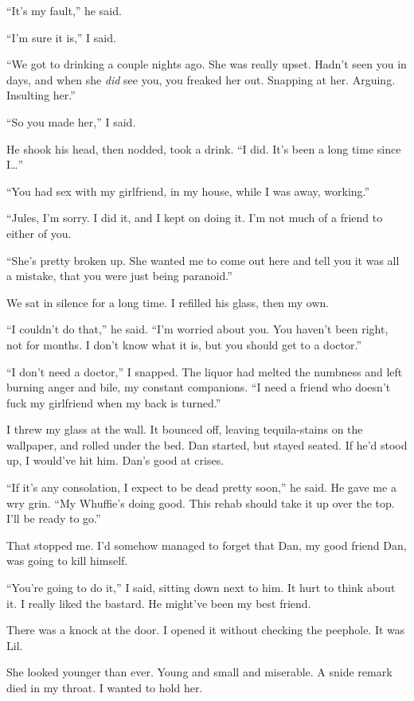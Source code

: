 “It's my fault,” he said.

“I'm sure it is,” I said.

“We got to drinking a couple nights ago. She was really upset.
Hadn't seen you in days, and when she \emph{did} see you, you
freaked her out. Snapping at her. Arguing. Insulting her.”

“So you made her,” I said.

He shook his head, then nodded, took a drink. “I did. It's been a
long time since I…”

“You had sex with my girlfriend, in my house, while I was away,
working.”

“Jules, I'm sorry. I did it, and I kept on doing it. I'm not much
of a friend to either of you.

“She's pretty broken up. She wanted me to come out here and tell
you it was all a mistake, that you were just being paranoid.”

We sat in silence for a long time. I refilled his glass, then my
own.

“I couldn't do that,” he said. “I'm worried about you. You haven't
been right, not for months. I don't know what it is, but you should
get to a doctor.”

“I don't need a doctor,” I snapped. The liquor had melted the
numbness and left burning anger and bile, my constant companions.
“I need a friend who doesn't fuck my girlfriend when my back is
turned.”

I threw my glass at the wall. It bounced off, leaving
tequila-stains on the wallpaper, and rolled under the bed. Dan
started, but stayed seated. If he'd stood up, I would've hit him.
Dan's good at crises.

“If it's any consolation, I expect to be dead pretty soon,” he
said. He gave me a wry grin. “My Whuffie's doing good. This rehab
should take it up over the top. I'll be ready to go.”

That stopped me. I'd somehow managed to forget that Dan, my good
friend Dan, was going to kill himself.

“You're going to do it,” I said, sitting down next to him. It hurt
to think about it. I really liked the bastard. He might've been my
best friend.

There was a knock at the door. I opened it without checking the
peephole. It was Lil.

She looked younger than ever. Young and small and miserable. A
snide remark died in my throat. I wanted to hold her.


